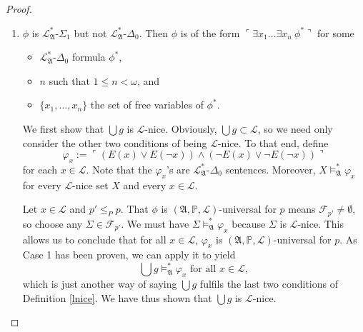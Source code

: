 \documentclass[12pt, twoside]{memoir}
\numberwithin{equation}{section}
\theoremstyle{definition}
\theoremstyle{remark}
\theoremstyle{definition}
\theoremstyle{definition}
\theoremstyle{definition}
\theoremstyle{remark}
\begin{document}
\begin{proof}
\begin{enumerate}[label=Case \arabic*:, leftmargin=50pt]
    We have thus shown that the set $$D_1 := \{q \in P : p^{\dagger} \subsetneq q \cap q^{\dagger}\}$$ is dense below $p^*$ in $\mathbb{P}$. Given the fact that $\mathbb{P}$ is $\Sigma_1$-definable in the language associated with $\mathfrak{A}$, $D_1$ obviously has the same property, so $g$ must meet $D_1$ with respect to $\mathbb{P}$. As $p^* \in g$, we can conclude $g \cap D_1 \neq \emptyset$, and let $q^* \in g \cap D_1$. But then $p^{\dagger} \subsetneq q^* \cap q^{\dagger}$, which implies $$p^{\dagger} \subsetneq q^* \cap q^{\dagger} \subset \bigcup g \cap q^{\dagger} = p^{\dagger},$$ a contradiction. 
    
    \item $\phi$ is $\mathcal{L}^{*}_{\mathfrak{A}}$-$\Sigma_1$ but not $\mathcal{L}^{*}_{\mathfrak{A}}$-$\Delta_0$. Then $\phi$ is of the form $\ulcorner \exists x_1 \dots \exists x_n \ \phi^* \urcorner$ for some 
    \begin{itemize}
        \item $\mathcal{L}^{*}_{\mathfrak{A}}$-$\Delta_0$ formula $\phi^*$,
        \item $n$ such that $1 \leq n < \omega$, and
        \item $\{x_1, \dots, x_n\}$ the set of free variables of $\phi^*$.
    \end{itemize} 
    
    We first show that $\bigcup g$ is $\mathcal{L}$-nice. Obviously, $\bigcup g \subset \mathcal{L}$, so we need only consider the other two conditions of being $\mathcal{L}$-nice. To that end, define $$\varphi_x := \ulcorner (E(x) \vee E(\neg x)) \wedge (\neg E(x) \vee \neg E(\neg x)) \urcorner$$ for each $x \in \mathcal{L}$. Note that the $\varphi_x$'s are $\mathcal{L}^{*}_{\mathfrak{A}}$-$\Delta_0$ sentences. Moreover, $X \models^{*}_{\mathfrak{A}} \varphi_x$ for every $\mathcal{L}$-nice set $X$ and every $x \in \mathcal{L}$. 
    
    Let $x \in \mathcal{L}$ and $p' \leq_{P} p$. That $\phi$ is $(\mathfrak{A}, \mathbb{P}, \mathcal{L})$-universal for $p$ means $\mathcal{F}_{p'} \neq \emptyset$, so choose any $\Sigma \in \mathcal{F}_{p'}$. We must have $\Sigma \models^{*}_{\mathfrak{A}} \varphi_x$ because $\Sigma$ is $\mathcal{L}$-nice. This allows us to conclude that for all $x \in \mathcal{L}$, $\varphi_x$ is $(\mathfrak{A}, \mathbb{P}, \mathcal{L})$-universal for $p$. As Case 1 has been proven, we can apply it to yield $$\bigcup g \models^{*}_{\mathfrak{A}} \varphi_x \text{ for all } x \in \mathcal{L},$$ which is just another way of saying $\bigcup g$ fulfils the last two conditions of Definition \ref{lnice}. We have thus shown that $\bigcup g$ is $\mathcal{L}$-nice. 
    

\end{enumerate}
\end{proof}
\end{document}
